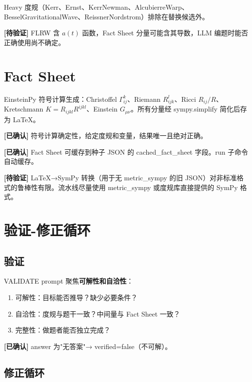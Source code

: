 \documentclass[12pt,a4paper]{article}
\newcommand{\certain}[1]{{\color{certcolor}\textbf{[已确认]}} #1}
\newcommand{\uncertain}[1]{{\color{uncertcolor}\textbf{[待验证]}} #1}
\begin{document}
Heavy 度规（Kerr、Ernst、KerrNewman、AlcubierreWarp、BesselGravitationalWave、ReissnerNordstrom）排除在替换候选外。

\uncertain{FLRW 含 $a(t)$ 函数，Fact Sheet 分量可能含其导数，LLM 编题时能否正确使用尚不确定。}

\section{Fact Sheet}

EinsteinPy 符号计算生成：Christoffel $\Gamma^k_{ij}$、Riemann $R^l_{ijk}$、Ricci $R_{ij}/R$、Kretschmann $K=R_{ijkl}R^{ijkl}$、Einstein $G_{\mu\nu}$。所有分量经 sympy.simplify 简化后存为 LaTeX。

\certain{符号计算确定性，给定度规和变量，结果唯一且绝对正确。}

\certain{Fact Sheet 可缓存到种子 JSON 的 cached\_fact\_sheet 字段。run 子命令自动缓存。}

\uncertain{LaTeX→SymPy 转换（用于无 metric\_sympy 的旧 JSON）对非标准格式的鲁棒性有限。流水线尽量使用 metric\_sympy 或度规库直接提供的 SymPy 格式。}

\section{验证-修正循环}

\subsection{验证}

VALIDATE prompt 聚焦\textbf{可解性和自洽性}：
\begin{enumerate}
    \item 可解性：目标能否推导？缺少必要条件？
    \item 自洽性：度规与题干一致？中间量与 Fact Sheet 一致？
    \item 完整性：做题者能否独立完成？
\end{enumerate}

\certain{answer 为"无答案"→ verified=false（不可解）。}

\subsection{修正循环}
\end{document}
